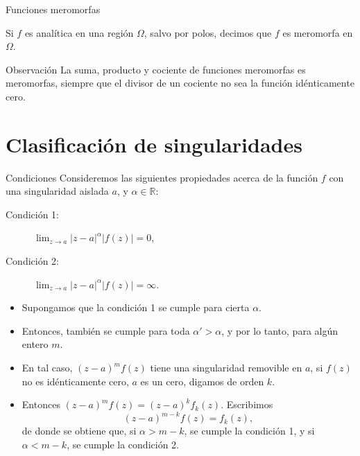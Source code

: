 \documentclass[spanish,presentation]{beamer}
\begin{document}
\begin{frame}[label=sec-1-4]{Funciones meromorfas}
\begin{definition}
Si \(f\) es analítica en una región \(\Omega\), salvo por polos,
decimos que \(f\) es \alert{meromorfa} en \(\Omega\).
\end{definition}

\begin{block}{Observación}
La suma, producto y cociente de funciones meromorfas es
meromorfas, siempre que el divisor de un cociente no sea la
función idénticamente cero. 
\end{block}
\end{frame}


\section{Clasificación de singularidades}
\label{sec-2}

\begin{frame}[label=sec-2-1]{Condiciones}
Consideremos las siguientes propiedades acerca de la función \(f\)
con una singularidad aislada \(a\), y \(\alpha\in \mathbb{R}\):

\begin{description}
\item[{Condición 1:}] \(\lim_{z\to a}|z-a|^{\alpha}|f(z)|=0\),
\item[{Condición 2:}] \(\lim_{z\to a}|z-a|^{\alpha}|f(z)|=\infty\).
\end{description}
\end{frame}

\begin{frame}[label=sec-2-2]{}
\begin{itemize}
\item Supongamos que la condición 1 se cumple para cierta \(\alpha\).
\item Entonces, también se cumple para toda \(\alpha'>\alpha\), y por
lo tanto, para algún entero \(m\).
\item En tal caso, \((z-a)^{m}f(z)\) tiene una singularidad removible
en \(a\), si \(f(z)\) no es idénticamente cero, \(a\) es un cero,
digamos de orden \(k\).
\item Entonces \((z-a)^{m}f(z)=(z-a)^{k}f_{k}(z)\). Escribimos
\begin{displaymath}
(z-a)^{m-k}f(z)=f_{k}(z),
\end{displaymath}
de donde se obtiene que, si \(\alpha>m-k\), se cumple la condición
1, y si \(\alpha<m-k\), se cumple la condición 2.
\end{itemize}
\end{frame}
\end{document}
